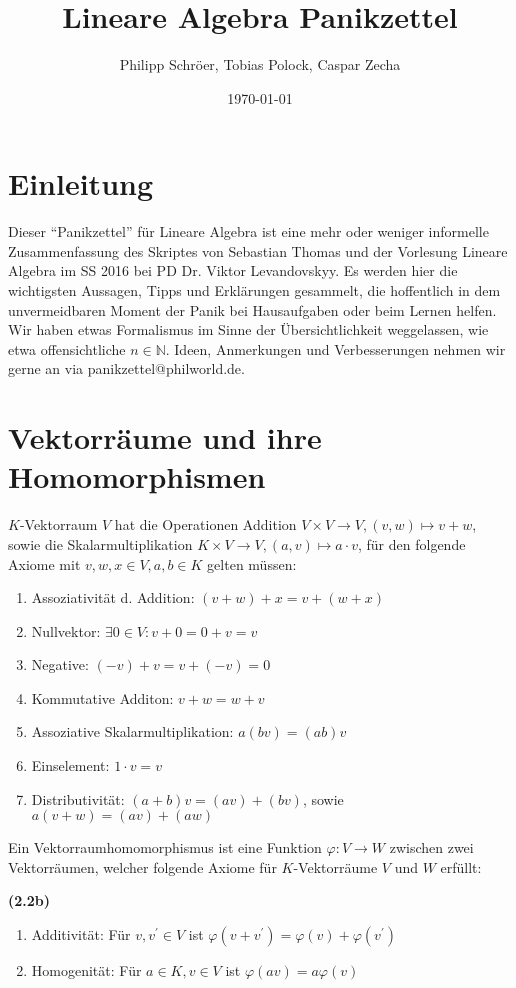 \documentclass[11pt]{scrartcl}
\title{\textbf{Lineare Algebra Panikzettel}}
\author{Philipp Schröer, Tobias Polock, Caspar Zecha}
\date{\today}
\newlength{\hangwidth}
\newcommand{\skript}[1]{\settowidth{\hangwidth}{\textbf{(#1)} }\hangpara{\hangwidth}{1}\textbf{(#1)} }
\begin{document}
\maketitle

\section{Einleitung}

Dieser ``Panikzettel'' für Lineare Algebra ist eine mehr oder weniger informelle Zusammenfassung des Skriptes von Sebastian Thomas und der Vorlesung Lineare Algebra im SS 2016 bei PD Dr. Viktor Levandovskyy. Es werden hier die wichtigsten Aussagen, Tipps und Erklärungen gesammelt, die hoffentlich in dem unvermeidbaren Moment der Panik bei Hausaufgaben oder beim Lernen helfen. Wir haben etwas Formalismus im Sinne der Übersichtlichkeit weggelassen, wie etwa offensichtliche $n \in \mathbb{N}$. Ideen, Anmerkungen und Verbesserungen nehmen wir gerne an via panikzettel@philworld.de.

\section{Vektorräume und ihre Homomorphismen}

$K$-Vektorraum $V$ hat die Operationen Addition  $V \times V \to V, (v,w) \mapsto v+w$, sowie die Skalarmultiplikation $K \times V \to V, (a,v) \mapsto a \cdot v  $, für den folgende Axiome mit $v, w, x \in V, a,b \in K$ gelten müssen:

\begin{enumerate}
\item Assoziativität d. Addition: $(v+w)+x = v+(w+x)$
\item Nullvektor: $\exists 0 \in V: v+0=0+v=v$
\item Negative: $(-v)+v=v+(-v)=0$
\item Kommutative Additon: $v+w=w+v$
\item Assoziative Skalarmultiplikation: $a(bv)=(ab)v$
\item Einselement: $1\cdot v=v$
\item Distributivität: $(a+b)v=(av)+(bv)$, sowie $a(v+w)=(av)+(aw)$
\end{enumerate}

Ein Vektorraumhomomorphismus ist eine Funktion $\varphi : V \to W$ zwischen zwei Vektorräumen, welcher folgende Axiome für $K$-Vektorräume $V$ und $W$ erfüllt:

\skript{2.2b} \begin{enumerate}
	\item Additivität: Für $v, v^\prime \in V$ ist $\varphi(v + v^\prime) = \varphi(v) + \varphi(v^\prime)$
	\item Homogenität: Für $a \in K, v \in V$ ist $\varphi(av) = a \varphi(v)$
\end{enumerate}
\end{document}
